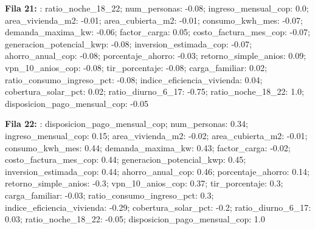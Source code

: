 {\footnotesize\textbf{Fila 21:} : ratio\_noche\_18\_22; num\_personas: -0.08; ingreso\_mensual\_cop: 0.0; area\_vivienda\_m2: -0.01; area\_cubierta\_m2: -0.01; consumo\_kwh\_mes: -0.07; demanda\_maxima\_kw: -0.06; factor\_carga: 0.05; costo\_factura\_mes\_cop: -0.07; generacion\_potencial\_kwp: -0.08; inversion\_estimada\_cop: -0.07; ahorro\_anual\_cop: -0.08; porcentaje\_ahorro: -0.03; retorno\_simple\_anios: 0.09; vpn\_10\_anios\_cop: -0.08; tir\_porcentaje: -0.08; carga\_familiar: 0.02; ratio\_consumo\_ingreso\_pct: -0.08; indice\_eficiencia\_vivienda: 0.04; cobertura\_solar\_pct: 0.02; ratio\_diurno\_6\_17: -0.75; ratio\_noche\_18\_22: 1.0; disposicion\_pago\_mensual\_cop: -0.05\par}
{\footnotesize\textbf{Fila 22:} : disposicion\_pago\_mensual\_cop; num\_personas: 0.34; ingreso\_mensual\_cop: 0.15; area\_vivienda\_m2: -0.02; area\_cubierta\_m2: -0.01; consumo\_kwh\_mes: 0.44; demanda\_maxima\_kw: 0.43; factor\_carga: -0.02; costo\_factura\_mes\_cop: 0.44; generacion\_potencial\_kwp: 0.45; inversion\_estimada\_cop: 0.44; ahorro\_anual\_cop: 0.46; porcentaje\_ahorro: 0.14; retorno\_simple\_anios: -0.3; vpn\_10\_anios\_cop: 0.37; tir\_porcentaje: 0.3; carga\_familiar: -0.03; ratio\_consumo\_ingreso\_pct: 0.3; indice\_eficiencia\_vivienda: -0.29; cobertura\_solar\_pct: -0.2; ratio\_diurno\_6\_17: 0.03; ratio\_noche\_18\_22: -0.05; disposicion\_pago\_mensual\_cop: 1.0\par}
